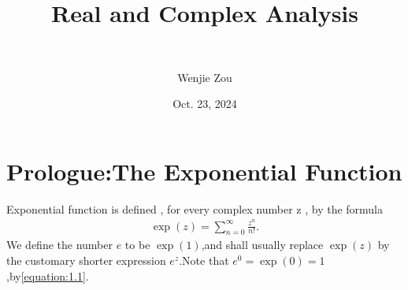 \documentclass[11pt]{elegantbook}
\title{Real and Complex Analysis}
\subtitle{\,\,}
\author{Wenjie\,\,Zou}
\institute{Elegant\LaTeX{} Program}
\date{Oct. 23, 2024}
\begin{document}
\maketitle

\frontmatter
\tableofcontents

\mainmatter

\everymath{\displaystyle} %


\chapter{Prologue:The Exponential Function}

\begin{definition}\label{definition:Exponential Function}
  Exponential function is defined , for every complex number z , by the formula
  \begin{align}\label{equation:1.1}
    \exp \left( z \right) =\sum_{n=0}^{\infty}{\frac{z^n}{n!}} .
  \end{align}
  We define the number $e$ to be $\exp(1)$,and shall usually replace $\exp(z)$ by the customary shorter expression $e^z$.Note that $e^0=\exp(0)=1$,by\eqref{equation:1.1}.
\end{definition}
\end{document}
